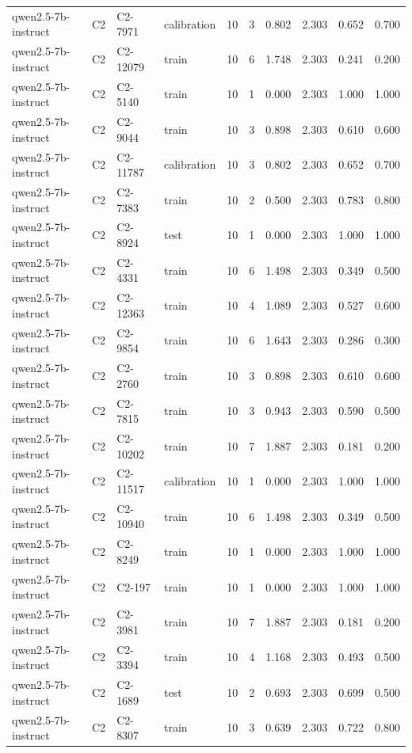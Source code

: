 \begin{table}
\begin{tabular}{llllrrrrrr}
qwen2.5-7b-instruct & C2 & C2-7971 & calibration & 10 & 3 & 0.802 & 2.303 & 0.652 & 0.700 \\
qwen2.5-7b-instruct & C2 & C2-12079 & train & 10 & 6 & 1.748 & 2.303 & 0.241 & 0.200 \\
qwen2.5-7b-instruct & C2 & C2-5140 & train & 10 & 1 & 0.000 & 2.303 & 1.000 & 1.000 \\
qwen2.5-7b-instruct & C2 & C2-9044 & train & 10 & 3 & 0.898 & 2.303 & 0.610 & 0.600 \\
qwen2.5-7b-instruct & C2 & C2-11787 & calibration & 10 & 3 & 0.802 & 2.303 & 0.652 & 0.700 \\
qwen2.5-7b-instruct & C2 & C2-7383 & train & 10 & 2 & 0.500 & 2.303 & 0.783 & 0.800 \\
qwen2.5-7b-instruct & C2 & C2-8924 & test & 10 & 1 & 0.000 & 2.303 & 1.000 & 1.000 \\
qwen2.5-7b-instruct & C2 & C2-4331 & train & 10 & 6 & 1.498 & 2.303 & 0.349 & 0.500 \\
qwen2.5-7b-instruct & C2 & C2-12363 & train & 10 & 4 & 1.089 & 2.303 & 0.527 & 0.600 \\
qwen2.5-7b-instruct & C2 & C2-9854 & train & 10 & 6 & 1.643 & 2.303 & 0.286 & 0.300 \\
qwen2.5-7b-instruct & C2 & C2-2760 & train & 10 & 3 & 0.898 & 2.303 & 0.610 & 0.600 \\
qwen2.5-7b-instruct & C2 & C2-7815 & train & 10 & 3 & 0.943 & 2.303 & 0.590 & 0.500 \\
qwen2.5-7b-instruct & C2 & C2-10202 & train & 10 & 7 & 1.887 & 2.303 & 0.181 & 0.200 \\
qwen2.5-7b-instruct & C2 & C2-11517 & calibration & 10 & 1 & 0.000 & 2.303 & 1.000 & 1.000 \\
qwen2.5-7b-instruct & C2 & C2-10940 & train & 10 & 6 & 1.498 & 2.303 & 0.349 & 0.500 \\
qwen2.5-7b-instruct & C2 & C2-8249 & train & 10 & 1 & 0.000 & 2.303 & 1.000 & 1.000 \\
qwen2.5-7b-instruct & C2 & C2-197 & train & 10 & 1 & 0.000 & 2.303 & 1.000 & 1.000 \\
qwen2.5-7b-instruct & C2 & C2-3981 & train & 10 & 7 & 1.887 & 2.303 & 0.181 & 0.200 \\
qwen2.5-7b-instruct & C2 & C2-3394 & train & 10 & 4 & 1.168 & 2.303 & 0.493 & 0.500 \\
qwen2.5-7b-instruct & C2 & C2-1689 & test & 10 & 2 & 0.693 & 2.303 & 0.699 & 0.500 \\
qwen2.5-7b-instruct & C2 & C2-8307 & train & 10 & 3 & 0.639 & 2.303 & 0.722 & 0.800 \\

\end{tabular}
\end{table}
